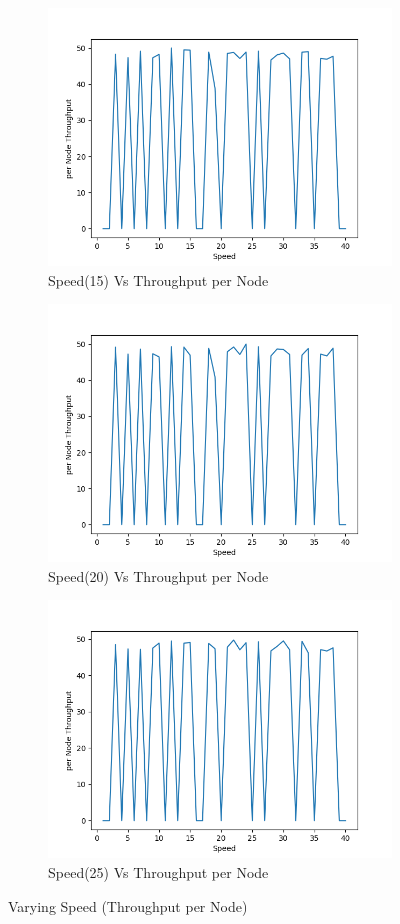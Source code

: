 \begin{figure}[h]
\begin{subfigure}{.5\textwidth}
    \includegraphics[width=.8\linewidth]{_11_2_mobile/Speed(15)vsperNodeThroughput.png}
         \caption{Speed(15) Vs Throughput per Node}
        \end{subfigure}
\begin{subfigure}{.5\textwidth}
    \centering
    \includegraphics[width=.8\linewidth]{_11_2_mobile/Speed(20)vsperNodeThroughput.png}
         \caption{Speed(20) Vs Throughput per Node}
        \end{subfigure}
\begin{subfigure}{.5\textwidth}
    \centering
    \includegraphics[width=.8\linewidth]{_11_2_mobile/Speed(25)vsperNodeThroughput.png}
         \caption{Speed(25) Vs Throughput per Node}
        \end{subfigure}
\caption{Varying Speed (Throughput per Node)}
\label{speed_per_node_throughput_mobile}
\end{figure}

